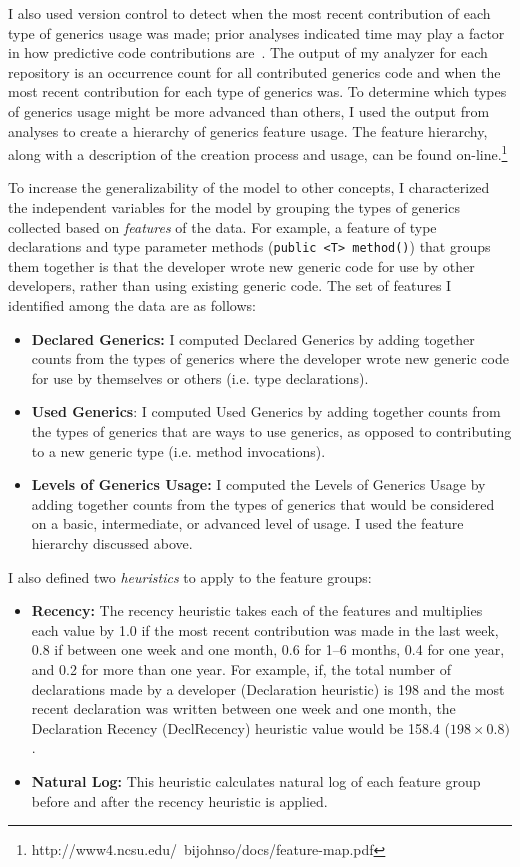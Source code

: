 \documentclass{llncs}
\begin{document}
I also used version control to detect when the most recent contribution of each type of generics usage was made; prior analyses indicated time may play a factor in how predictive code contributions are~\cite{johnson2015bespoke}.
The output of my analyzer for each repository is an occurrence count for all contributed generics code and when the most recent contribution for each type of generics was.
To determine which types of generics usage might be more advanced than others, I used the output from analyses to create a hierarchy of generics feature usage. The feature hierarchy, along with a description of the creation process and usage, can be found on-line.\footnote{http://www4.ncsu.edu/~bijohnso/docs/feature-map.pdf}

To increase the generalizability of the model to other concepts, I characterized the independent variables for the model by grouping the types of generics collected based on \emph{features} of the data. For example, a feature of type declarations and type parameter methods (\texttt{public <T> method()}) that groups them together is that the developer wrote new generic code for use by other developers, rather than using existing generic code.
The set of features I identified among the data are as follows:
\begin{itemize}
	\item \textbf{Declared Generics:} I computed Declared Generics by adding together counts from the types of generics where the developer wrote new generic code for use by themselves or others (i.e. type declarations).
	\item \textbf{Used Generics}: I computed Used Generics by adding together counts from the types of generics that are ways to use generics, as opposed to contributing to a new generic type (i.e. method invocations).
	\item \textbf{Levels of Generics Usage:} I computed the Levels of Generics Usage by adding together counts from the types of generics that would be considered on a basic, intermediate, or advanced level of usage. I used the feature hierarchy discussed above. 
\end{itemize}

\noindent I also defined two \emph{heuristics} to apply to the feature groups:

\begin{itemize}
	\item \textbf{Recency:} The recency heuristic takes each of the features and multiplies each value by 1.0 if the most recent contribution was made in the last week, 0.8 if between one week and one month, 0.6 for 1--6 months, 0.4 for one year, and 0.2 for more than one year.
	For example, if, the total number of declarations made by a developer (Declaration heuristic) is 198 and the most recent declaration was written between one week and one month, the Declaration Recency (DeclRecency) heuristic value would be 158.4 (\(198 \times 0.8)\). 
	\item \textbf{Natural Log:} This heuristic calculates natural log of each feature group before and after the recency heuristic is applied.
\end{itemize}
	
\end{document}
